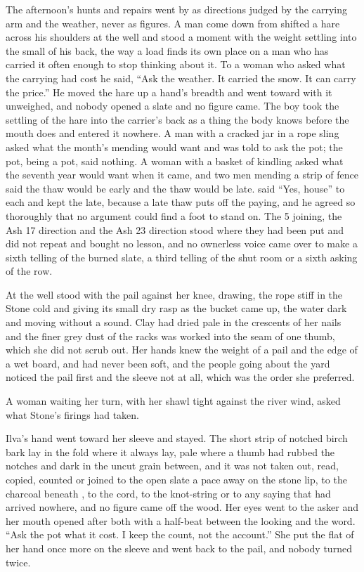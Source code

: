 \scenebreak

The afternoon's hunts and repairs went by as directions judged by the carrying arm and the weather, never as figures. A man come down from  shifted a hare across his shoulders at the well and stood a moment with the weight settling into the small of his back, the way a load finds its own place on a man who has carried it often enough to stop thinking about it. To a woman who asked what the carrying had cost he said, “Ask the weather. It carried the snow. It can carry the price.” He moved the hare up a hand's breadth and went toward  with it unweighed, and nobody opened a slate and no figure came. The boy took the settling of the hare into the carrier's back as a thing the body knows before the mouth does and entered it nowhere. A man with a cracked jar in a rope sling asked what the month's mending would want and was told to ask the pot; the pot, being a pot, said nothing. A woman with a basket of kindling asked what the seventh year would want when it came, and two men mending a strip of fence said the thaw would be early and the thaw would be late.  said “Yes, house” to each and kept the late, because a late thaw puts off the paying, and he agreed so thoroughly that no argument could find a foot to stand on. The  5 joining, the Ash 17 direction and the Ash 23 direction stood where they had been put and did not repeat and bought no lesson, and no ownerless voice came over  to make a sixth telling of the burned slate, a third telling of the shut room or a sixth asking of the row.

At the well  stood with the pail against her knee, drawing, the rope stiff in the Stone cold and giving its small dry rasp as the bucket came up, the water dark and moving without a sound. Clay had dried pale in the crescents of her nails and the finer grey dust of the racks was worked into the seam of one thumb, which she did not scrub out. Her hands knew the weight of a pail and the edge of a wet board, and had never been soft, and the people going about the yard noticed the pail first and the sleeve not at all, which was the order she preferred.

A woman waiting her turn, with her shawl tight against the river wind, asked what Stone's firings had taken.

Ilva's hand went toward her sleeve and stayed. The short strip of notched birch bark lay in the fold where it always lay, pale where a thumb had rubbed the notches and dark in the uncut grain between, and it was not taken out, read, copied, counted or joined to the open slate a pace away on the stone lip, to the charcoal beneath , to the cord, to the knot-string or to any saying that had arrived nowhere, and no figure came off the wood. Her eyes went to the asker and her mouth opened after both with a half-beat between the looking and the word. “Ask the pot what it cost. I keep the count, not the account.” She put the flat of her hand once more on the sleeve and went back to the pail, and nobody turned twice.


